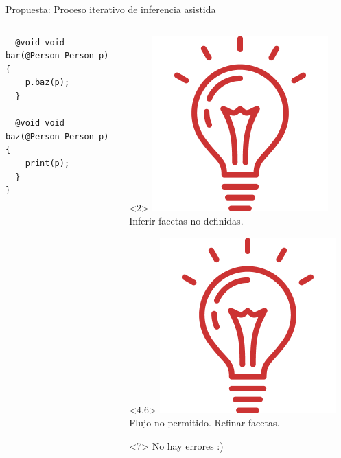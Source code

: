 \documentclass[aspectratio=169,10pt]{beamer}
\begin{document}
\begin{frame}[fragile]{Propuesta: Proceso iterativo de inferencia asistida}
\begin{columns}
\begin{column}{0.5\textwidth}
\begin{onlyenv}
\begin{lstlisting}
  @void void bar(@Person Person p) {
    p.baz(p);
  }

  @void void baz(@Person Person p) {
    print(p);
  }
}
\end{lstlisting}
\end{onlyenv}
      \end{column}

      \begin{column}{0.5\textwidth}  %
				\begin{onlyenv}<2>
          \includegraphics[height=\fontcharht\font`\B*3]{img/bulb.png}
					\colorbox{red!30}{Inferir facetas no definidas.}
			\end{onlyenv}
			\begin{onlyenv}<4,6>
				\includegraphics[height=\fontcharht\font`\B*3]{img/bulb.png}
				\colorbox{red!30}{Flujo no permitido. Refinar facetas.}
		\end{onlyenv}
		\begin{onlyenv}<7>
			\colorbox{green!30}{No hay errores :)}
	\end{onlyenv}
      \end{column}
    \end{columns}



\end{frame}
\end{document}
